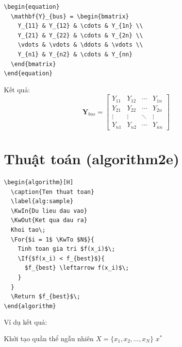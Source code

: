 \begin{lstlisting}[style=latexstyle]
\begin{equation}
  \mathbf{Y}_{bus} = \begin{bmatrix}
    Y_{11} & Y_{12} & \cdots & Y_{1n} \\
    Y_{21} & Y_{22} & \cdots & Y_{2n} \\
    \vdots & \vdots & \ddots & \vdots \\
    Y_{n1} & Y_{n2} & \cdots & Y_{nn}
  \end{bmatrix}
\end{equation}
\end{lstlisting}

Kết quả:
\begin{equation}
  \mathbf{Y}_{bus} = \begin{bmatrix}
    Y_{11} & Y_{12} & \cdots & Y_{1n} \\
    Y_{21} & Y_{22} & \cdots & Y_{2n} \\
    \vdots & \vdots & \ddots & \vdots \\
    Y_{n1} & Y_{n2} & \cdots & Y_{nn}
  \end{bmatrix}
  \label{eq:ybus}
\end{equation}

\section{Thuật toán (algorithm2e)}
\label{sec:algorithm}

\begin{lstlisting}[style=latexstyle, caption={Viết thuật toán}]
\begin{algorithm}[H]
  \caption{Ten thuat toan}
  \label{alg:sample}
  \KwIn{Du lieu dau vao}
  \KwOut{Ket qua dau ra}
  Khoi tao\;
  \For{$i = 1$ \KwTo $N$}{
    Tinh toan gia tri $f(x_i)$\;
    \If{$f(x_i) < f_{best}$}{
      $f_{best} \leftarrow f(x_i)$\;
    }
  }
  \Return $f_{best}$\;
\end{algorithm}
\end{lstlisting}

Ví dụ kết quả:

\begin{algorithm}[H]
  \caption{Thuật toán tối ưu hóa mẫu}
  \label{alg:sample}
  Khởi tạo quần thể ngẫu nhiên $X = \{x_1, x_2, \ldots, x_N\}$\;
  \Return $x^*$\;
\end{algorithm}
